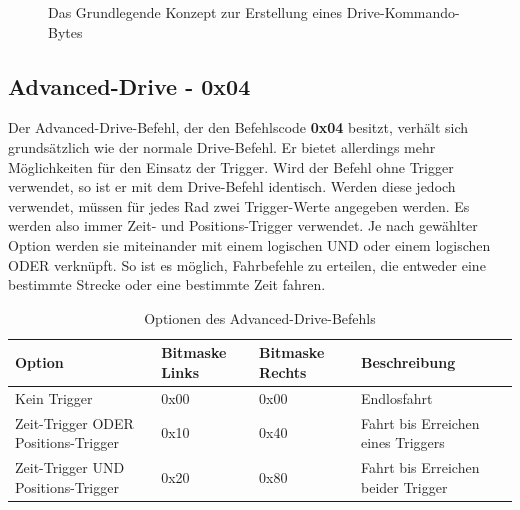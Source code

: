 \begin{figure}[h]
 \centering
 \caption{\label{prot_drive_concept}Das Grundlegende Konzept zur Erstellung eines Drive-Kommando-Bytes}
\end{figure}

\subsection{Advanced-Drive - 0x04}
Der Advanced-Drive-Befehl, der den Befehlscode \textbf{0x04} besitzt, verhält sich grundsätzlich
wie der normale Drive-Befehl. Er bietet allerdings mehr Möglichkeiten für den Einsatz der Trigger.
Wird der Befehl ohne Trigger
verwendet, so ist er mit dem Drive-Befehl identisch. Werden diese jedoch verwendet,
müssen für jedes Rad zwei Trigger-Werte angegeben werden. Es werden also immer Zeit-
und Positions-Trigger verwendet. Je nach gewählter Option werden sie miteinander mit einem logischen
UND oder einem logischen ODER verknüpft. So ist es möglich, Fahrbefehle
zu erteilen, die entweder eine bestimmte Strecke oder eine bestimmte Zeit fahren.
\begin{table}[h]
\begin{center}
	\begin{tabularx}{\linewidth}{|X|l|l|X|}
		\hline
		\textbf{Option} & \textbf{Bitmaske Links} & \textbf{Bitmaske Rechts} & \textbf{Beschreibung} \\
		\hline
		\hline
		Kein Trigger				& 0x00						   & 0x00						   & Endlosfahrt \\
		\hline
		Zeit-Trigger ODER Positions-Trigger	& 0x10						   & 0x40						   & Fahrt bis Erreichen eines Triggers\\
		\hline
		Zeit-Trigger UND Positions-Trigger  & 0x20						   & 0x80						   & Fahrt bis Erreichen beider Trigger\\
		\hline
	\end{tabularx}
	\caption{\label{protocol_advanced_drive} Optionen des Advanced-Drive-Befehls}
\end{center}
\end{table}

